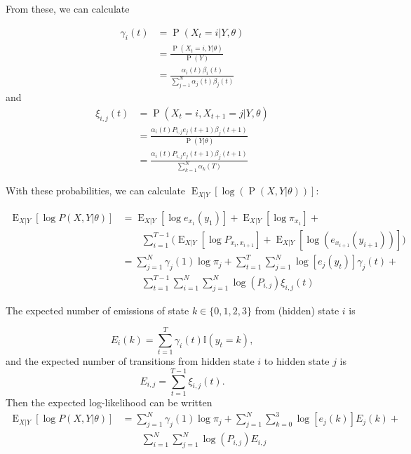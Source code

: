 \documentclass{article}
\DeclareMathOperator{\Prob}{P}
\DeclareMathOperator{\E}{E}
\begin{document}
From these, we can calculate 

\begin{align*}
    \gamma_i(t) &= \Prob(X_t=i|Y,\theta) \\
                &= \frac{\Prob(X_t=i,Y|\theta)}{\Prob(Y)}\\
                &= \frac{\alpha_i(t)\beta_i(t)}
                    {\sum_{j=1}^N\alpha_j(t)\beta_j(t)}
\end{align*}
and
\begin{align*}
    \xi_{i,j}(t) &= \Prob(X_t=i,X_{t+1}=j|Y,\theta) \\
                 &= \frac{\alpha_i(t)P_{i,j}e_j(t+1)\beta_j(t+1)}
                       {\Prob(Y|\theta)}\\
                 &= \frac{\alpha_i(t)P_{i,j}e_j(t+1)\beta_j(t+1)}
                       {\sum_{k=1}^N\alpha_k(T)}
\end{align*}

With these probabilities, we can calculate $\E_{X|Y}[\log(\Prob(X,Y|\theta))]$:

\begin{align*}
    \E_{X|Y}\left[\log P\left(X,Y|\theta\right)\right] &= 
        \E_{X|Y}\left[\log e_{x_1}(y_1)\right] + 
        \E_{X|Y}\left[\log \pi_{x_1}\right] + \\
        &\qquad
        \sum_{i=1}^{T-1}\bigg(\E_{X|Y}\left[\log P_{x_i,x_{i+1}}\right] +
        \E_{X|Y}\left[\log(e_{x_{i+1}}(y_{i+1}))\right]\bigg)\\
        &= \sum_{j=1}^N\gamma_j(1) \log \pi_j + 
        \sum_{t=1}^T\sum_{j=1}^N\log\left[e_j(y_t)\right]\gamma_j(t)+\\
        &\qquad\sum_{t=1}^{T-1}\sum_{i=1}^N\sum_{j=1}^N\log(P_{i,j})\xi_{i,j}(t)
\end{align*}

The expected number of emissions of state $k \in \{0,1,2,3\}$ from (hidden) state
$i$ is 

\begin{equation}
    E_i(k) = \sum_{t=1}^T \gamma_i(t)\mathbb{I}(y_t = k),
\end{equation}
and the expected number of transitions from hidden state $i$ to hidden state
$j$ is
\begin{equation}
    E_{i,j} = \sum_{t=1}^{T-1}\xi_{i,j}(t).
\end{equation}
Then the expected log-likelihood can be written
\begin{align*}
    \E_{X|Y}\left[\log P\left(X,Y|\theta\right)\right] &= 
        \sum_{j=1}^N\gamma_j(1) \log \pi_j + 
        \sum_{j=1}^N\sum_{k=0}^3\log\left[e_j(k)\right]E_j(k)+\\
        &\qquad\sum_{i=1}^N\sum_{j=1}^N\log(P_{i,j})E_{i,j}
\end{align*}
\end{document}
